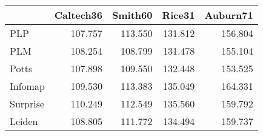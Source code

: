 \begin{tabular}{lrrrr}
\toprule
{} & Caltech36 & Smith60 &  Rice31 & Auburn71 \\
\midrule
PLP      &   107.757 & 113.550 & 131.812 &  156.804 \\
PLM      &   108.254 & 108.799 & 131.478 &  155.104 \\
Potts    &   107.898 & 109.550 & 132.448 &  153.525 \\
Infomap  &   109.530 & 113.383 & 135.049 &  164.331 \\
Surprise &   110.249 & 112.549 & 135.560 &  159.792 \\
Leiden   &   108.805 & 111.772 & 134.494 &  159.737 \\
\bottomrule
\end{tabular}

